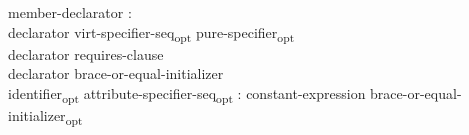 \begin{modification}
member-declarator :\\
\tabto{1em}declarator virt-specifier-seq\textsubscript{opt}
 pure-specifier\textsubscript{opt}\\
\tabto{1em}declarator requires-clause
\\
\tabto{1em}declarator brace-or-equal-initializer\\
\tabto{1em}identifier\textsubscript{opt} attribute-specifier-seq\textsubscript{opt} : constant-expression brace-or-equal-initializer\textsubscript{opt}\\
\end{modification}
